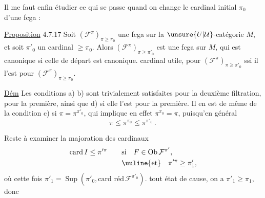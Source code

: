 Il me faut enfin étudier ce qui se
passe quand on change le cardinal initial
$\pi_0$ d'une fcga :

\uline{Proposition} 4.7.17 Soit $(\mathcal F^\pi)_{\pi\geq\pi_0}$ une fcga
sur la $\unsure{U|\mathcal U}$-catégorie $M$, et soit $\pi'_0$ un
cardinal $\geq\pi_0$. Alors $(\mathcal F^\pi)_{\pi\geq\pi'_0}$ est une
fcga sur $M$, qui est canonique si
celle de départ  est canonique. 
 cardinal  utile,  pour
$(\mathcal F^\pi)_{\pi\geq\pi'_0}$ ssi il l'est pour $(\mathcal F^\pi)_{\pi\geq\pi_0}$.
%

\uline{Dém} Les conditions a) b) sont trivialement
satisfaites pour la deuxième filtration,
   pour la première,
ainsi que d) si elle l'est pour la première.
Il en est de même de la condition
c) si $\pi=\pi^{\pi'_0}$, qui implique en effet
$\pi^{\pi_0}=\pi$, puisqu'en général
\[
\pi\leq\pi^{\pi_0}\leq\pi^{\pi'_0}\mathpunct{.}
\]

Reste à examiner la majoration des
cardinaux
\[
\begin{aligned}
\operatorname{card} I\leq\pi'^{\pi}\qquad &\text{si}\quad F\in\operatorname{Ob}\mathcal F^{\pi'},\\
&\text{\uuline{et}}\quad\pi'^{\pi}\geq\pi'_1,
\end{aligned}
\]
où cette fois $\pi'_1=\operatorname{Sup}(\pi'_0,\text{card réd}\,\mathcal F^{\pi'_0})$. 
 tout état de cause, on a $\pi'_1\geq\pi_1$, donc
